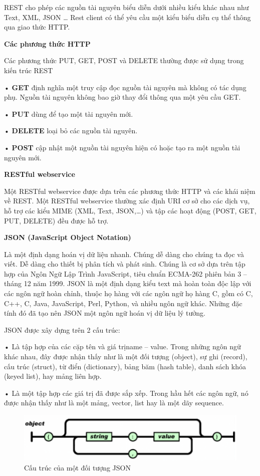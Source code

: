 REST cho phép các nguồn tài nguyên biểu diễn dưới nhiều kiểu khác nhau như Text, XML, JSON … Rest client có thể yêu cầu một kiểu biểu diễn cụ thể thông qua giao thức HTTP.

\textbf{Các phương thức HTTP}

Các phương thức PUT, GET, POST và DELETE thường được sử dụng trong kiến trúc REST

• \textbf{GET} định nghĩa một truy cập đọc nguồn tài nguyên mà không có tác dụng phụ. Nguồn tài nguyên không bao giờ thay đổi thông qua một yêu cầu GET.

• \textbf{PUT} dùng để tạo một tài nguyên mới.

• \textbf{DELETE} loại bỏ các nguồn tài nguyên.

• \textbf{POST} cập nhật một nguồn tài nguyên hiện có hoặc tạo ra một nguồn tài nguyên mới.

\textbf{RESTful webservice}

Một RESTful webservice được dựa trên các phương thức HTTP và các khái niệm về REST. Một RESTful webservice thường xác định URI cơ sở cho các dịch vụ, hỗ trợ các kiểu MIME (XML, Text, JSON,…) và tập các hoạt động (POST, GET, PUT, DELETE) đều được hỗ trợ.

\textbf{JSON (JavaScript Object Notation)}

Là một định dạng hoán vị dữ liệu nhanh. Chúng dễ dàng cho chúng ta đọc và viết. Dễ dàng cho thiết bị phân tích và phát sinh. Chúng là cơ sở dựa trên tập hợp của Ngôn Ngữ Lập Trình JavaScript, tiêu chuẩn ECMA-262 phiên bản 3 – tháng 12 năm 1999. JSON là một định dạng kiểu text mà hoàn toàn độc lập với các ngôn ngữ hoàn chỉnh, thuộc họ hàng với các ngôn ngữ họ hàng C, gồm có C, C++, C, Java, JavaScript, Perl, Python, và nhiều ngôn ngữ khác. Những đặc tính đó đã tạo nên JSON một ngôn ngữ hoán vị dữ liệu lý tưởng.

JSON được xây dựng trên 2 cấu trúc:

• Là tập hợp của các cặp tên và giá trịname – value. Trong những ngôn ngữ khác nhau, đây được nhận thấy như là một đối tượng (object), sự ghi (record), cấu trúc (struct), từ điển (dictionary), bảng băm (hash table), danh sách khóa (keyed list), hay mảng liên hợp.

• Là một tập hợp các giá trị đã được sắp xếp. Trong hầu hết các ngôn ngữ, nó được nhận thấy như là một mảng, vector, list hay là một dãy sequence.


\begin{figure}[H]
	\centering    
	\includegraphics[width=1.0\textwidth]{json0}
	\caption[Cấu trúc của một đối tượng JSON]{Cấu trúc của một đối tượng JSON}
	\label{fig: json0}
\end{figure}

